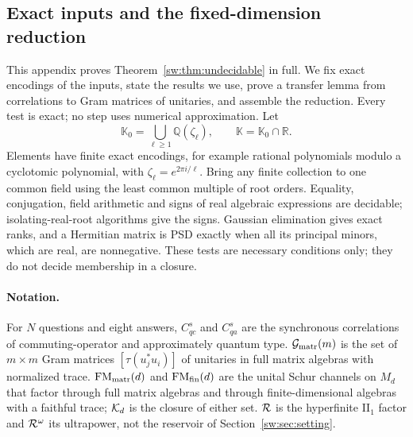 \subsection{Exact inputs and the fixed-dimension reduction}\label{sw:app:fixeddim}
This appendix proves Theorem~\ref{sw:thm:undecidable} in full. We fix exact encodings of the inputs, state the results we use, prove a transfer lemma from correlations to Gram matrices of unitaries, and assemble the reduction. Every test is exact; no step uses numerical approximation. Let
\[
\mathbb K_0=\bigcup_{\ell\ge1}\mathbb Q(\zeta_\ell),\qquad \mathbb K=\mathbb K_0\cap\mathbb R.
\]
Elements have finite exact encodings, for example rational polynomials modulo a cyclotomic polynomial, with $\zeta_\ell=e^{2\pi i/\ell}$. Bring any finite collection to one common field using the least common multiple of root orders. Equality, conjugation, field arithmetic and signs of real algebraic expressions are decidable; isolating-real-root algorithms give the signs. Gaussian elimination gives exact ranks, and a Hermitian matrix is PSD exactly when all its principal minors, which are real, are nonnegative. These tests are necessary conditions only; they do not decide membership in a closure.

\paragraph{Notation.} For $N$ questions and eight answers, $C_{qc}^s$ and $C_{qa}^s$ are the synchronous correlations of commuting-operator and approximately quantum type. $\mathcal G_{\rm matr}(m)$ is the set of $m\times m$ Gram matrices $[\tau(u_j^*u_i)]$ of unitaries in full matrix algebras with normalized trace. $\mathrm{FM}_{\rm matr}(d)$ and $\mathrm{FM}_{\rm fin}(d)$ are the unital Schur channels on $M_d$ that factor through full matrix algebras and through finite-dimensional algebras with a faithful trace; $\mathcal K_d$ is the closure of either set. $\mathcal R$ is the hyperfinite II$_1$ factor and $\mathcal R^\omega$ its ultrapower, not the reservoir of Section~\ref{sw:sec:setting}.

